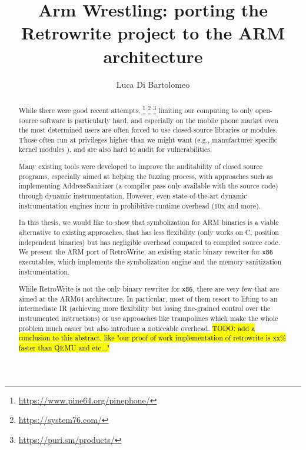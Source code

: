 \documentclass[a4paper,11pt,oneside]{report}
\title{Arm Wrestling: porting the Retrowrite project to the ARM architecture}
\author{Luca Di Bartolomeo} \adviser{Prof. Mathias Payer (EPFL)}
\newcommand{\sysname}{RetroWrite\xspace}
\newcommand{\todo}[1]{%
	\begingroup 
	\sethlcolor{cyan}%
	\hl{TODO: #1}%
	\endgroup
}
\begin{document}
\maketitle
\makededication
\makeacks


\begin{abstract}

	While there were good recent attempts, 
	\footnote{\url{https://www.pine64.org/pinephone/}}
	\footnote{\url{https://system76.com/}}
	\footnote{\url{https://puri.sm/products/}}
	limiting our computing to only open-source software
	is particularly hard, and especially on the mobile phone market even the
	most determined users are often forced to use closed-source libraries or
	modules.  Those often run at privileges higher than we might want (e.g.,
	manufacturer specific kernel modules \cite{androidclosed}), and are also
	hard to audit for vulnerabilities. 

	Many existing tools were developed to improve the auditability of closed
	source programs, especially aimed at helping the fuzzing process, with
	approaches such as implementing AddressSanitizer (a compiler pass only
	available with the source code) through dynamic instrumentation. However,  
	even state-of-the-art dynamic instrumentation engines incur in prohibitive 
	runtime overhead (10x and more). 

	In this thesis, we would like to show that symbolization for ARM binaries 
	is a viable alternative to existing approaches, that has less flexibility 
	(only works on C, position independent binaries) but has
	negligible overhead compared to compiled source code. We present the ARM
	port of \sysname, an existing static binary rewriter for \texttt{x86}
	executables, which implements the symbolization engine and the memory
	sanitization instrumentation. 

	While \sysname is not the only binary rewriter for \texttt{x86}, there are 
	very few that are aimed at the ARM64 architecture. In particular, most of 
	them resort to lifting to an intermediate IR (achieving more flexibility 
	but losing fine-grained control over the instrumented instructions) or use 
	approaches like trampolines which make the whole problem much easier but 
	also introduce a noticeable overhead.
	\todo{add a conclusion to this abstract, like "our proof of work 
	implementation of retrowrite is xx\% faster than QEMU and etc..."}


\end{abstract}


\maketoc
\end{document}
